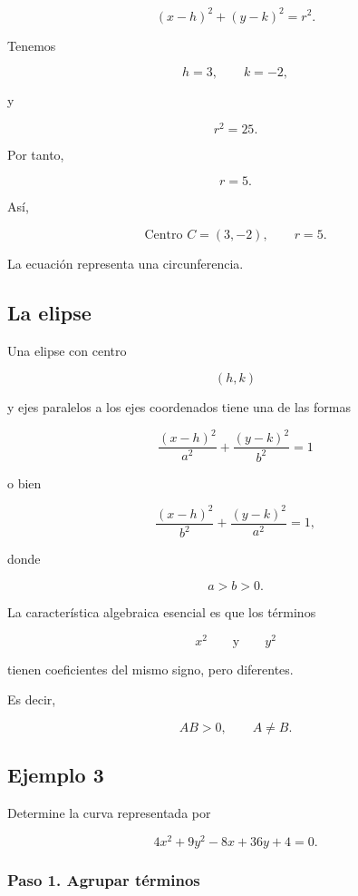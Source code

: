 \documentclass[12pt]{article}
\begin{document}
\[
(x-h)^2+(y-k)^2=r^2.
\]

Tenemos

\[
h=3,
\qquad
k=-2,
\]

y

\[
r^2=25.
\]

Por tanto,

\[
r=5.
\]

Así,

\[
\boxed{
\text{Centro }C=(3,-2),
\qquad
r=5.
}
\]

La ecuación representa una circunferencia.

\subsection{La elipse}

Una elipse con centro

\[
(h,k)
\]

y ejes paralelos a los ejes coordenados tiene una de las formas

\[
\boxed{
\frac{(x-h)^2}{a^2}
+
\frac{(y-k)^2}{b^2}
=1
}
\]

o bien

\[
\boxed{
\frac{(x-h)^2}{b^2}
+
\frac{(y-k)^2}{a^2}
=1,
}
\]

donde

\[
a>b>0.
\]

La característica algebraica esencial es que los términos

\[
x^2
\qquad\text{y}\qquad
y^2
\]

tienen coeficientes del mismo signo, pero diferentes.

Es decir,

\[
\boxed{
AB>0,
\qquad
A\neq B.
}
\]

\subsection*{Ejemplo 3}

Determine la curva representada por

\[
4x^2+9y^2-8x+36y+4=0.
\]

\subsubsection*{Paso 1. Agrupar términos}
\end{document}
